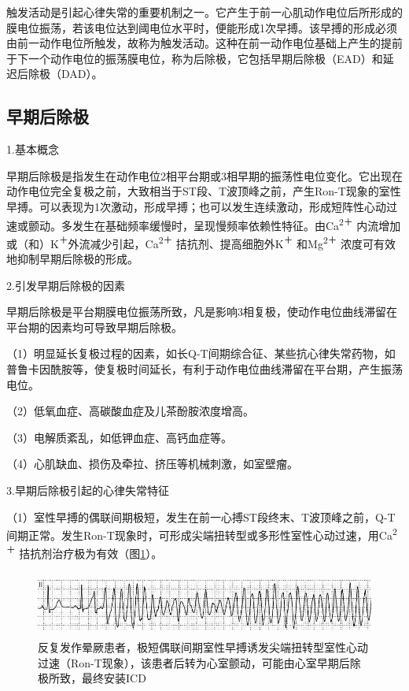 触发活动是引起心律失常的重要机制之一。它产生于前一心肌动作电位后所形成的膜电位振荡，若该电位达到阈电位水平时，便能形成1次早搏。该早搏的形成必须由前一动作电位所触发，故称为触发活动。这种在前一动作电位基础上产生的提前于下一个动作电位的振荡膜电位，称为后除极，它包括早期后除极（EAD）和延迟后除极（DAD）。

\protect\hypertarget{text00024.htmlux5cux23subid303}{}{}

\subsection{早期后除极}

1.基本概念

早期后除极是指发生在动作电位2相平台期或3相早期的振荡性电位变化。它出现在动作电位完全复极之前，大致相当于ST段、T波顶峰之前，产生Ron-T现象的室性早搏。可以表现为1次激动，形成早搏；也可以发生连续激动，形成短阵性心动过速或颤动。多发生在基础频率缓慢时，呈现慢频率依赖性特征。由Ca\textsuperscript{2＋}
内流增加或（和）K\textsuperscript{＋}外流减少引起，Ca\textsuperscript{2＋}
拮抗剂、提高细胞外K\textsuperscript{＋} 和Mg\textsuperscript{2＋}
浓度可有效地抑制早期后除极的形成。

2.引发早期后除极的因素

早期后除极是平台期膜电位振荡所致，凡是影响3相复极，使动作电位曲线滞留在平台期的因素均可导致早期后除极。

（1）明显延长复极过程的因素，如长Q-T间期综合征、某些抗心律失常药物，如普鲁卡因酰胺等，使复极时间延长，有利于动作电位曲线滞留在平台期，产生振荡电位。

（2）低氧血症、高碳酸血症及儿茶酚胺浓度增高。

（3）电解质紊乱，如低钾血症、高钙血症等。

（4）心肌缺血、损伤及牵拉、挤压等机械刺激，如室壁瘤。

3.早期后除极引起的心律失常特征

（1）室性早搏的偶联间期极短，发生在前一心搏ST段终末、T波顶峰之前，Q-T间期正常。发生Ron-T现象时，可形成尖端扭转型或多形性室性心动过速，用Ca\textsuperscript{2＋}
拮抗剂治疗极为有效（图\ref{fig17-1}）。

\begin{figure}[!htbp]
 \centering
 \includegraphics[width=5.53125in,height=0.84375in]{./images/Image00300.jpg}
 \captionsetup{justification=centering}
 \caption{反复发作晕厥患者，极短偶联间期室性早搏诱发尖端扭转型室性心动过速（Ron-T现象），该患者后转为心室颤动，可能由心室早期后除极所致，最终安装ICD}
 \label{fig17-1}
  \end{figure} 

